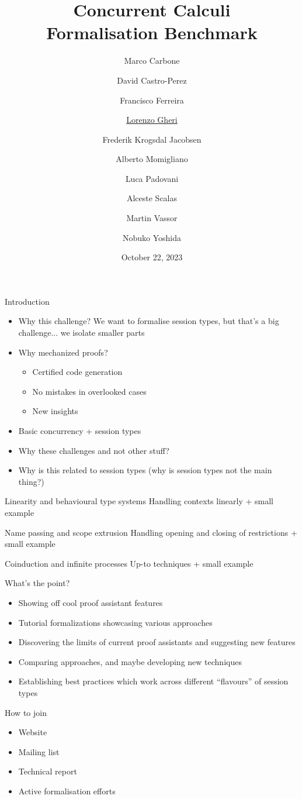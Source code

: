 \documentclass[aspectratio=169,hyperref={pdfpagelabels=false}]{beamer}
\title[Concurrent Calculi Formalisation Benchmark]{\texorpdfstring{Concurrent Calculi\\Formalisation Benchmark}{Concurrent Calculi Formalisation Benchmark}}
\author{Marco Carbone
\and David Castro-Perez
\and Francisco Ferreira
\and \texorpdfstring{\underline{Lorenzo Gheri}}{Lorenzo Gheri}
\and Frederik Krogsdal Jacobsen
\and Alberto Momigliano
\and Luca Padovani
\and Alceste Scalas
\and Martin Vassor
\and Nobuko Yoshida}
\date{October 22, 2023}
\begin{document}
\inserttitlepage

\begin{frame}{Introduction}
  \begin{itemize}
  \item Why this challenge? We want to formalise session types, but that's a big challenge... we isolate smaller parts
  \item Why mechanized proofs?
    \begin{itemize}
    \item Certified code generation
    \item No mistakes in overlooked cases
    \item New insights
    \end{itemize}
  \item Basic concurrency + session types
  \item Why these challenges and not other stuff?
  \item Why is this related to session types (why is session types not the main thing?)
  \end{itemize}
\end{frame}

\begin{frame}{Linearity and behavioural type systems}
  Handling contexts linearly + small example
\end{frame}

\begin{frame}{Name passing and scope extrusion}
  Handling opening and closing of restrictions + small example
\end{frame}

\begin{frame}{Coinduction and infinite processes}
  Up-to techniques + small example
\end{frame}

\begin{frame}{What's the point?}
  \begin{itemize}
  \item Showing off cool proof assistant features
  \item Tutorial formalizations showcasing various approaches
  \item Discovering the limits of current proof assistants and suggesting new features
  \item Comparing approaches, and maybe developing new techniques
  \item Establishing best practices which work across different ``flavours'' of session types
  \end{itemize}
\end{frame}

\begin{frame}{How to join}
  \begin{itemize}
  \item Website
  \item Mailing list
  \item Technical report
  \item Active formalisation efforts
  \end{itemize}
\end{frame}
\end{document}
